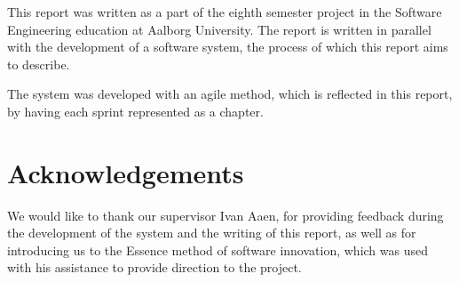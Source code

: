 This report was written as a part of the eighth semester project in the Software Engineering education at Aalborg University. The report is written in parallel with the development of a software system, the process of which this report aims to describe.

The system was developed with an agile method, which is reflected in this report, by having each sprint represented as a chapter.

\section*{Acknowledgements}

We would like to thank our supervisor Ivan Aaen, for providing feedback during the development of the system and the writing of this report, as well as for introducing us to the Essence method of software innovation, which was used with his assistance to provide direction to the project.
